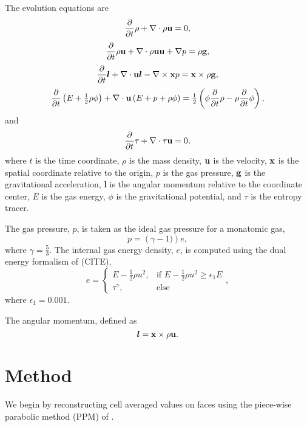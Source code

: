 \documentclass{aastex63}
\begin{document}
\newcommand{\ddt}[1]{\frac{\partial}{\partial t} #1} 
\newcommand{\divergence}[1]{{\bf \nabla} \cdot #1}
\newcommand{\curl}[1]{{\bf \nabla} \times #1}
\newcommand{\gradient}[1]{{\bf \nabla} #1}
\newcommand{\vect}[1]{{\bf #1}}
\newcommand{\am}{\bm{l}}

The evolution equations are
\begin{equation}
\ddt{\rho}+\divergence{\rho\vect{u}}=0,
\label{rho}
\end{equation}
\begin{equation}
\ddt{\rho \vect{u}}+\divergence{\rho\vect{u}\vect{u} + \gradient{p}}=\rho \vect{g},
\label{rhou}
\end{equation}
\begin{equation}
\ddt{\am}+\divergence{\vect{u}\am - \curl{\vect{x} p}}=\vect{x}\times\rho \vect{g},
\label{am}
\end{equation}
\begin{equation}
\ddt{\left(E+\tfrac{1}{2}\rho\phi\right)}+\divergence{\vect{u}\left(E+p+\rho\phi\right)}=\tfrac{1}{2}\left(\phi\ddt{\rho}-\rho\ddt{\phi}\right),
\label{E}
\end{equation}
and
\begin{equation}
\ddt{\tau}+\divergence{\tau\vect{u}}=0,
\label{tau}
\end{equation}
where $t$ is the time coordinate, $\rho$ is the mass density, $\vect{u}$ is the velocity, $\vect{x}$ is the spatial coordinate relative to the origin, 
$p$ is the gas pressure, $\vect{g}$ is the gravitational acceleration, 
$\am$ is the angular momentum relative to the coordinate center, $E$ is the gas energy, $\phi$ is the gravitational potential, and $\tau$ is the entropy
tracer.

The gas pressure, $p$, is taken as the ideal gas pressure for a monatomic gas, 
\begin{equation}
p = \left( \gamma - 1 ) \right) e, 
\end{equation}
where $\gamma = \tfrac{5}{3}$. The internal gas energy density, $e$, is computed using the dual energy formalism of (CITE),
\begin{equation}
    e = 
\begin{cases}
    E - \tfrac{1}{2} \rho u^2, & \text{if } E - \tfrac{1}{2} \rho u^2 \geq \epsilon_1 E\\
    \tau^{\gamma},             & \text{else}
\end{cases},
\end{equation}
where $\epsilon_1 = 0.001$.

The angular momentum, defined as
\begin{equation}
\am = \vect{x} \times \rho \vect{u}.
\end{equation}


\section{Method}
We begin by reconstructing cell averaged values on faces using the piece-wise parabolic method (PPM) of \cite{COLELLA1984}.



\end{document}
